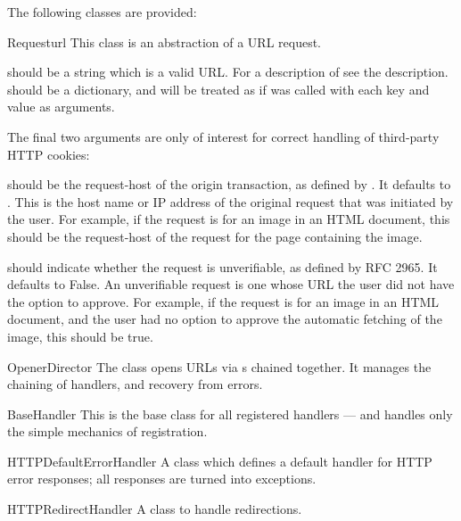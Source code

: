 The following classes are provided:

\begin{classdesc}{Request}{url
    }
This class is an abstraction of a URL request.

 should be a string which is a valid URL.  For a description
of  see the  description.
 should be a dictionary, and will be treated as if
 was called with each key and value as arguments.

The final two arguments are only of interest for correct handling of
third-party HTTP cookies:

 should be the request-host of the origin
transaction, as defined by .  It defaults to
.  This is the host name or IP
address of the original request that was initiated by the user.  For
example, if the request is for an image in an HTML document, this
should be the request-host of the request for the page containing the
image.

 should indicate whether the request is
unverifiable, as defined by RFC 2965.  It defaults to False.  An
unverifiable request is one whose URL the user did not have the option
to approve.  For example, if the request is for an image in an HTML
document, and the user had no option to approve the automatic fetching
of the image, this should be true.
\end{classdesc}

\begin{classdesc}{OpenerDirector}{}
The  class opens URLs via s
chained together. It manages the chaining of handlers, and recovery
from errors.
\end{classdesc}

\begin{classdesc}{BaseHandler}{}
This is the base class for all registered handlers --- and handles only
the simple mechanics of registration.
\end{classdesc}

\begin{classdesc}{HTTPDefaultErrorHandler}{}
A class which defines a default handler for HTTP error responses; all
responses are turned into  exceptions.
\end{classdesc}

\begin{classdesc}{HTTPRedirectHandler}{}
A class to handle redirections.
\end{classdesc}

